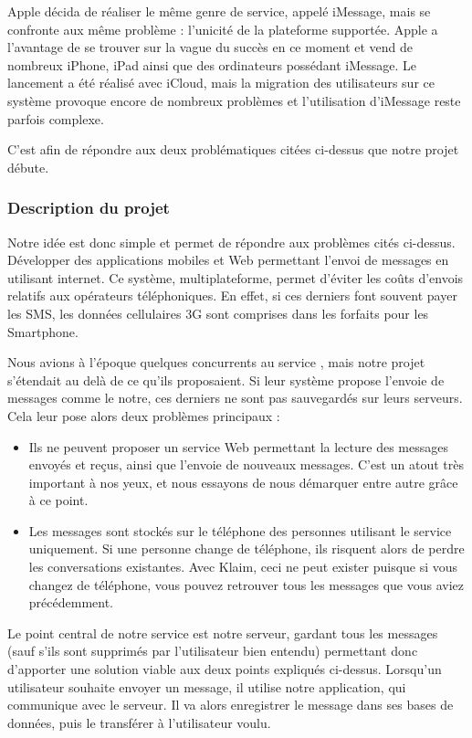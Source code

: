 \documentclass{article}
\begin{document}
	Apple décida de réaliser le même genre de service, appelé iMessage, mais se confronte aux même problème : l’unicité de la plateforme supportée. Apple a l'avantage de se trouver sur la vague du succès en ce moment et vend de nombreux iPhone, iPad ainsi que des ordinateurs possédant iMessage. Le lancement a été réalisé avec iCloud, mais la migration des utilisateurs sur ce système provoque encore de nombreux problèmes et l'utilisation d'iMessage reste parfois complexe.
	
	C’est afin de répondre aux deux problématiques citées ci-dessus que notre projet débute.  

\subsubsection{Description du projet}
	Notre idée est donc simple et permet de répondre aux problèmes cités ci-dessus. Développer des applications mobiles et Web permettant l’envoi de messages en utilisant internet. Ce système, multiplateforme, permet d’éviter les coûts d’envois relatifs aux opérateurs téléphoniques. En effet, si ces derniers font souvent payer les SMS, les données cellulaires 3G sont comprises dans les forfaits pour les Smartphone.
	
	Nous avions à l’époque quelques concurrents au service , mais notre projet s’étendait au delà de ce qu’ils proposaient. Si leur système propose l’envoie de messages comme le notre, ces derniers ne sont pas sauvegardés sur leurs serveurs. Cela leur pose alors deux problèmes principaux :
\begin{itemize}
\item Ils ne peuvent proposer un service Web permettant la lecture des messages envoyés et reçus, ainsi que l’envoie de nouveaux messages. C'est un atout très important à nos yeux, et nous essayons de nous démarquer entre autre grâce à ce point.
\item Les messages sont stockés sur le téléphone des personnes utilisant le service uniquement. Si une personne change de téléphone, ils risquent alors de perdre les conversations existantes. Avec Klaim, ceci ne peut exister puisque si vous changez de téléphone, vous pouvez retrouver tous les messages que vous aviez précédemment.
\end{itemize}

Le point central de notre service est notre serveur, gardant tous les messages (sauf s’ils sont supprimés par l’utilisateur bien entendu) permettant donc d’apporter une solution viable aux deux points expliqués ci-dessus. Lorsqu'un utilisateur souhaite envoyer un message, il utilise notre application, qui communique avec le serveur. Il va alors enregistrer le message dans ses bases de données, puis le transférer à l'utilisateur voulu. 
	
\end{document}
